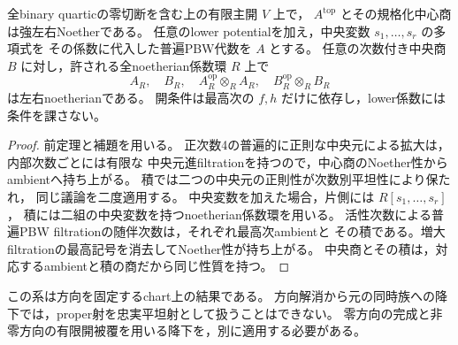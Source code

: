 \begin{corollary}\label{cor:degree-two-all-top-strong-product}
全binary quarticの零切断を含む上の有限主開 $V$ 上で，
$A^{\mathrm{top}}$ とその規格化中心商は強左右Noetherである。
任意のlower potentialを加え，中央変数 $s_1,\ldots,s_r$ の多項式を
その係数に代入した普遍PBW代数を $A$ とする。
任意の次数付き中央商 $B$ に対し，許される全noetherian係数環 $R$ 上で
\[
 A_R,\quad B_R,\quad
 A_R^{\mathrm{op}}\otimes_R A_R,\quad
 B_R^{\mathrm{op}}\otimes_R B_R
\]
は左右noetherianである。
開条件は最高次の $f,h$ だけに依存し，lower係数には条件を課さない。
\end{corollary}
\begin{proof}
前定理と補題を用いる。
正次数4の普遍的に正則な中央元による拡大は，内部次数ごとには有限な
中央元進filtrationを持つので，中心商のNoether性からambientへ持ち上がる。
積では二つの中央元の正則性が次数別平坦性により保たれ，
同じ議論を二度適用する。
中央変数を加えた場合，片側には $R[s_1,\ldots,s_r]$，
積には二組の中央変数を持つnoetherian係数環を用いる。
活性次数による普遍PBW filtrationの随伴次数は，それぞれ最高次ambientと
その積である。増大filtrationの最高記号を消去してNoether性が持ち上がる。
中央商とその積は，対応するambientと積の商だから同じ性質を持つ。
\end{proof}

この系は方向を固定するchart上の結果である。
方向解消から元の同時族への降下では，proper射を忠実平坦射として扱うことはできない。
零方向の完成と非零方向の有限開被覆を用いる降下を，別に適用する必要がある。
